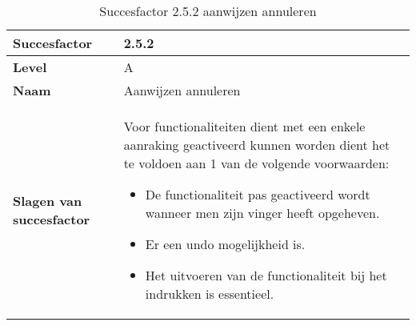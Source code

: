 \begin{table}[H]
    \centering
    \caption{Succesfactor 2.5.2 aanwijzen annuleren}
    
    
    \hspace*{-1cm}\begin{tabular}{|l|p{12cm}|} 
        \hline
        \textbf{Succesfactor}                 & 2.5.2                                                                                                                                                                                                                                                                                                                                                                                                                                                                                                        \\ 
        \hline
        \textbf{Level}                        & A                                                                                                                                                                                                                                                                                                                                                                                                                                                                                                               \\ 
        \hline
        \textbf{Naam}                         & Aanwijzen annuleren~                                                                                                                                                                                                                                                                                                                                                                                                                                                                                      \\ 
        \hline
        \textbf{Slagen van succesfactor}      & Voor functionaliteiten dient met een enkele aanraking geactiveerd kunnen worden dient het te voldoen aan 1 van de volgende voorwaarden:
        \begin{itemize}
            \item De functionaliteit pas geactiveerd wordt wanneer men zijn vinger heeft opgeheven.
            \item Er een undo mogelijkheid is.
            \item Het uitvoeren van de functionaliteit bij het indrukken is essentieel.

\end{itemize}
\end{tabular}
\end{table}
